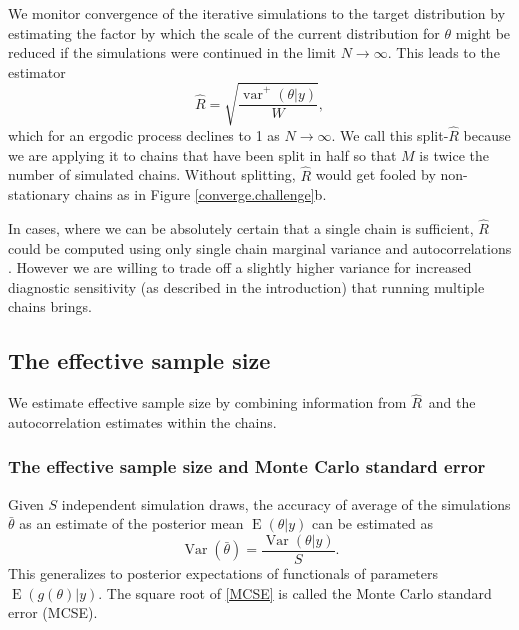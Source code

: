 \documentclass[american,]{article}
\DeclareMathOperator{\Var}{Var}
\DeclareMathOperator{\var}{var}
\DeclareMathOperator{\E}{E}
\newcommand{\Rhat}{$\widehat{R}$}
\theoremstyle{definition}
\begin{document}
We monitor convergence of the iterative simulations to the target
distribution by estimating the factor by which the scale of the current
distribution for \(\theta\) might be reduced if the simulations were
continued in the limit \(N\rightarrow\infty\). This leads to the estimator
\begin{equation}
\widehat{R} = \sqrt{\frac{\widehat{\var}^+(\theta | y)}{W}},
\end{equation}
which for an ergodic process declines to 1 as \(N\rightarrow\infty\). We call this
split-\(\widehat{R}\) because we are applying it to chains that
have been split in half so that \(M\) is twice the number of simulated
chains. Without splitting, \(\widehat{R}\) would get fooled by
non-stationary chains as in Figure \ref{converge.challenge}b.

In cases, where we can be absolutely certain that a single chain is
sufficient, \(\widehat{R}\) could be computed using only
single chain marginal variance and autocorrelations \citep[see,
e.g.][]{vats2018revisiting}. However we are willing to trade off a
slightly higher variance for increased diagnostic sensitivity (as
described in the introduction) that running multiple chains brings.

\hypertarget{ESS}{%
\subsection{The effective sample size}\label{ESS}}

We estimate effective sample size by combining
information from \Rhat\ and the autocorrelation estimates within the
chains.

\subsubsection*{The effective sample size and Monte Carlo standard error}

Given $S$ independent simulation draws, the accuracy of average of the
simulations \(\bar{\theta}\) as an estimate of the posterior mean
\(\E(\theta | y)\) can be estimated as
\begin{equation}
  \Var(\bar{\theta}) = \frac{\Var(\theta|y)}{S}.
  \label{MCSE}
\end{equation}
This generalizes to posterior expectations of functionals of
parameters \(\E\left(g(\theta) | y\right)\).  The square root of
\eqref{MCSE} is called the Monte Carlo standard error (MCSE).
\end{document}
